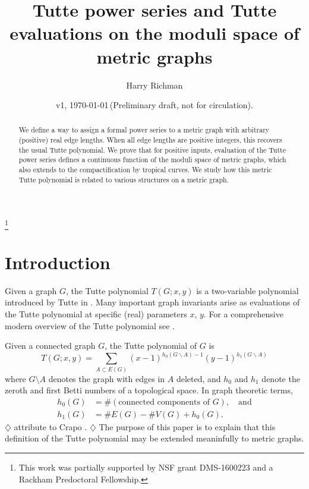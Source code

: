 \documentclass{amsart}
\theoremstyle{definition}
\newcommand{\harry}[1]{{\color{red} \sf $\diamondsuit$  {#1} $\diamondsuit$ }}
\newcommand{\note}[1]{\harry{#1}}
\begin{document}
\title[Tutte power series on metric graphs]{Tutte power series and Tutte evaluations on the moduli space of metric graphs}
\author{Harry Richman}
\date{v1, \today  \,(Preliminary draft, not for circulation).}
\thanks{This work was partially supported by NSF grant DMS-1600223
and a Rackham Predoctoral Fellowship.}


\begin{abstract}
We define a way to assign a formal power series to a metric graph with arbitrary
(positive) real edge lengths.
When all edge lengths are positive integers,
this recovers the usual Tutte polynomial.
We prove that for positive inputs, evaluation of the Tutte power series
defines a continuous function of the moduli space of metric graphs,
which also extends to the compactification by tropical curves.
We study how this metric Tutte polynomial is
related to various structures on a metric graph.
\end{abstract}
\maketitle


\section{Introduction}
Given a graph $G$,
the Tutte polynomial $T(G;x,y)$ 
is 
 a two-variable polynomial %
introduced by Tutte in \cite{Tut}.
Many important graph invariants arise as evaluations of 
the Tutte polynomial %
at specific (real) parameters $x$, $y$.
For a comprehensive modern overview of the Tutte polynomial see \cite{EMM}.

Given a connected graph $G $, 
the Tutte polynomial of $G$ is 
\begin{equation}
\label{eq:tutte-graph}
T(G; x,y) = \sum_{A \subset E(G)} (x-1)^{h_0(G\backslash A) - 1}(y-1)^{h_1(G\backslash A)}
\end{equation}
where $G\setminus A$ denotes the graph with edges in $A$ deleted,
and $h_0$ and $h_1$ denote the zeroth and first Betti numbers of 
a topological space.
In graph theoretic terms,
\begin{align*}
h_0(G) &= \#(\text{connected components of }G), \quad\text{and}\\
h_1(G) &= \# E(G) - \# V(G) + h_0(G) .
\end{align*}
\note{attribute to Crapo \cite{Cra}.}
The purpose of this paper is to explain that this definition of the Tutte polynomial may be extended meaninfully to metric graphs.
\end{document}
